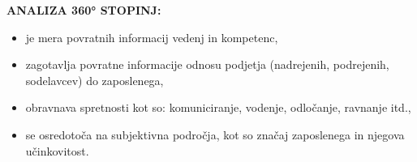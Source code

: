 \textbf{ANALIZA 360° STOPINJ:}
\begin{itemize}
\item je mera povratnih informacij vedenj in kompetenc,
\item zagotavlja povratne informacije odnosu podjetja (nadrejenih, podrejenih, sodelavcev) do zaposlenega,
\item obravnava spretnosti kot so: komuniciranje, vodenje, odločanje, ravnanje itd.,
\item se osredotoča na subjektivna področja, kot so značaj zaposlenega in njegova učinkovitost.
\end{itemize} 